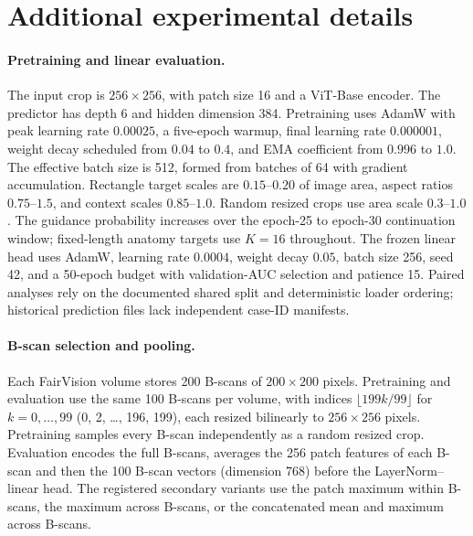\section{Additional experimental details}
\label{app:repro}

\paragraph{Pretraining and linear evaluation.}
The input crop is $256\times256$, with patch size 16 and a ViT-Base encoder.
The predictor has depth 6 and hidden dimension 384.
Pretraining uses AdamW with peak learning rate $0.00025$, a five-epoch
warmup, final learning rate $0.000001$, weight decay scheduled from $0.04$
to $0.4$, and EMA coefficient from $0.996$ to $1.0$.
The effective batch size is 512, formed from batches of 64 with gradient
accumulation. Rectangle target scales are $0.15$--$0.20$ of image area,
aspect ratios $0.75$--$1.5$, and context scales $0.85$--$1.0$.
Random resized crops use area scale $0.3$--$1.0$.
The guidance probability increases over the epoch-25 to epoch-30
continuation window; fixed-length anatomy targets use $K=16$ throughout.
The frozen linear head uses AdamW, learning rate $0.0004$, weight decay
$0.05$, batch size 256, seed 42, and a 50-epoch budget with validation-AUC
selection and patience 15. Paired analyses rely on the documented shared split
and deterministic loader ordering; historical prediction files lack
independent case-ID manifests.

\paragraph{B-scan selection and pooling.}
Each FairVision volume stores 200 B-scans of $200\times200$ pixels. Pretraining
and evaluation use the same 100 B-scans per volume, with indices
$\lfloor 199k/99\rfloor$ for $k=0,\ldots,99$ (0, 2, \ldots, 196, 199), each
resized bilinearly to $256\times256$ pixels. Pretraining samples every B-scan
independently as a random resized crop. Evaluation encodes the full B-scans,
averages the 256 patch features of each B-scan and then the 100 B-scan vectors
(dimension 768) before the LayerNorm--linear head. The registered secondary
variants use the patch maximum within B-scans, the maximum across B-scans, or
the concatenated mean and maximum across B-scans.

